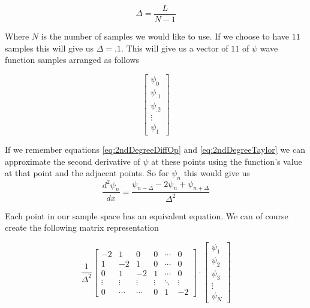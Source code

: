 \documentclass[authoryearcitations]{UoYCSproject}
\begin{document}
$$\Delta = \frac{L}{N - 1} $$

Where $N$ is the number of samples we would like to use. If we choose to have $11$ samples this will give us
$\Delta = .1$. This will give us a vector of $11$ of $\psi$ wave function samples arranged as follows 

$$\begin{bmatrix} 
        \psi _0  \\
        \psi _{.1}  \\
        \psi _{.2} \\
        \vdots    \\
        \psi _{1} 
   \end{bmatrix}
$$


If we remember equations \ref{eq:2ndDegreeDiffOp} and \ref{eq:2ndDegreeTaylor} we can approximate the second 
derivative of $\psi$ at these points
using the function's value at that point and the adjacent points. So for $\psi _{n}$ this would give us
$$\frac{d ^2 \psi _{n}}{dx} = \frac{\psi _{n-\Delta} - 2\psi _{n} + \psi _{n+\Delta}}{\Delta ^2} $$

Each point in our sample space has an equivalent equation. We can of course create the following matrix representation

\begin{equation}
\frac{1}{\Delta ^2}\begin{bmatrix}
                -2     &   1    &     0    &     0   & \cdots & 0 \\
                1      &  -2    &     1    &     0   & \cdots & 0 \\
                0      &   1    &    -2    &     1   & \cdots & 0 \\
                \vdots & \vdots &   \vdots & \vdots  & \ddots & \vdots \\
                0      & \cdots &    \cdots     &     0   &    1   & -2
              \end{bmatrix}\cdot \begin{bmatrix} 
                                        \psi _1  \\
                                        \psi _{2}  \\
                                        \psi _{3} \\
                                        \vdots    \\
                                        \psi _{N} 
                                   \end{bmatrix}
\end{equation}
\end{document}
